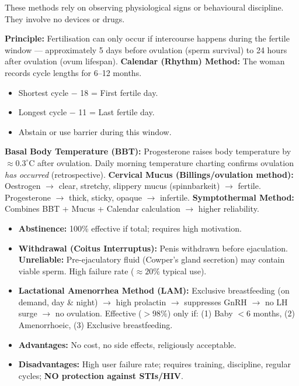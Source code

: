 \documentclass[11pt]{article}
\newcommand{\cle}[1]{{\popxbold\color{popdark}#1}}
\newcounter{popsec}
\newcounter{popsub}
\newcommand{\courssub}[1]{%
  \stepcounter{popsub}%
  \par\vspace{9pt}\noindent{\popxbold\fontsize{11.5}{13}\selectfont\color{popink}{\color{poporange}\thepopsec.\thepopsub}\hspace{6pt}#1}\par\nopagebreak\vspace{4pt}
}
\begin{document}
\courssub{Natural Methods}

These methods rely on observing physiological signs or behavioural discipline. They involve no devices or drugs.

\begin{experience}
\textbf{Principle:} Fertilisation can only occur if intercourse happens during the \cle{fertile window} — approximately 5 days before ovulation (sperm survival) to 24 hours after ovulation (ovum lifespan).
\textbf{Calendar (Rhythm) Method:} The woman records cycle lengths for 6–12 months.
\begin{itemize}
    \item Shortest cycle $-$ 18 = First fertile day.
    \item Longest cycle $-$ 11 = Last fertile day.
    \item Abstain or use barrier during this window.
\end{itemize}
\textbf{Basal Body Temperature (BBT):} Progesterone raises body temperature by $\approx 0.3^\circ\mathrm{C}$ after ovulation. Daily morning temperature charting confirms ovulation \emph{has occurred} (retrospective).
\textbf{Cervical Mucus (Billings/ovulation method):} Oestrogen $\to$ clear, stretchy, slippery mucus (spinnbarkeit) $\to$ fertile. Progesterone $\to$ thick, sticky, opaque $\to$ infertile.
\textbf{Symptothermal Method:} Combines BBT + Mucus + Calendar calculation $\to$ higher reliability.
\end{experience}

\begin{aretenir}
\begin{itemize}
    \item \textbf{Abstinence:} 100\% effective if total; requires high motivation.
    \item \textbf{Withdrawal (Coitus Interruptus):} Penis withdrawn before ejaculation. \textbf{Unreliable:} Pre-ejaculatory fluid (Cowper's gland secretion) may contain viable sperm. High failure rate ($\approx 20\%$ typical use).
    \item \textbf{Lactational Amenorrhea Method (LAM):} Exclusive breastfeeding (on demand, day \& night) $\to$ high prolactin $\to$ suppresses GnRH $\to$ no LH surge $\to$ no ovulation. Effective ($>98\%$) only if: (1) Baby $< 6$ months, (2) Amenorrhoeic, (3) Exclusive breastfeeding.
    \item \textbf{Advantages:} No cost, no side effects, religiously acceptable.
    \item \textbf{Disadvantages:} High user failure rate; requires training, discipline, regular cycles; \textbf{NO protection against STIs/HIV}.
\end{itemize}
\end{aretenir}
\end{document}
